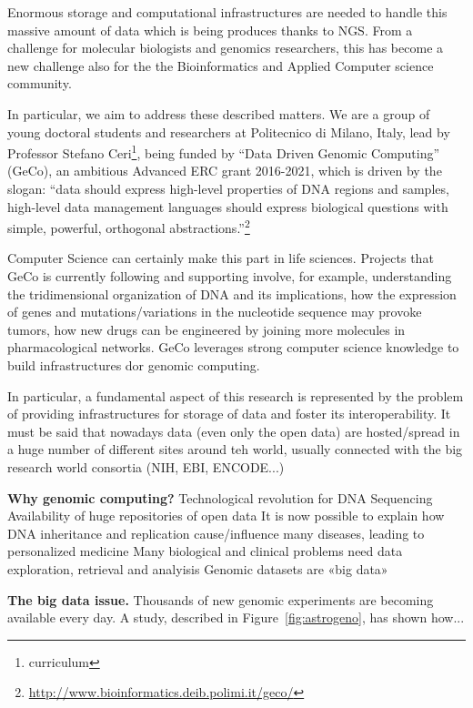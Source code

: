 \documentclass[journal]{IEEEtran}
\begin{document}
Enormous storage and computational infrastructures are needed to handle this massive amount of data which is being produces thanks to NGS. From a challenge for molecular biologists and genomics researchers, this has become a new challenge also for the the Bioinformatics and Applied Computer science community.

In particular, we aim to address these described  matters. We are a group of young doctoral students and researchers at Politecnico di Milano, Italy, lead by Professor Stefano Ceri\footnote{curriculum}, being funded by ``Data Driven Genomic Computing'' (GeCo), an ambitious Advanced ERC grant 2016-2021, which is driven by the slogan: ``data should express high-level properties of DNA regions and samples, high-level data management languages should express biological questions with simple, powerful, orthogonal abstractions.''\footnote{\url{http://www.bioinformatics.deib.polimi.it/geco/}}

Computer Science can certainly make this part in life sciences. Projects that GeCo is  currently following and supporting involve, for example, understanding the tridimensional organization of DNA and its implications, how the expression of genes and mutations/variations in the nucleotide sequence may provoke tumors, how new drugs can be engineered by joining more molecules in pharmacological networks. 
GeCo leverages strong computer science knowledge to build infrastructures dor genomic computing.


In particular, a fundamental aspect of this research is represented by the problem of providing infrastructures for storage of data and foster its interoperability.
It must be said that nowadays data (even only the open data) are hosted/spread in a huge number of different sites around teh world, usually connected with the big research world consortia (NIH, EBI, ENCODE...)

\textbf{Why genomic computing?}
Technological revolution for DNA Sequencing
Availability of huge repositories of open data
It is now possible to explain how DNA inheritance and replication cause/influence many diseases, leading to personalized medicine
Many biological and clinical problems need data exploration, retrieval and analyisis
Genomic datasets are «big data»

\textbf{The big data issue.}
Thousands of new genomic experiments are becoming available every day. A study, described in Figure~\ref{fig:astrogeno}, has shown how...
\end{document}
